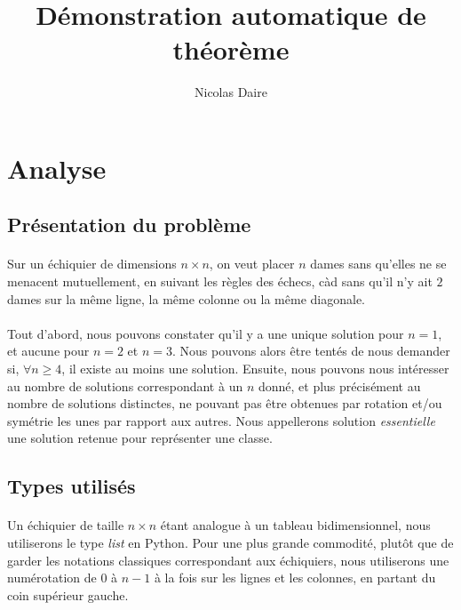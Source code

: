 \documentclass[a4paper]{article}
\title{Démonstration automatique de théorème}
\author{Nicolas Daire}
\date{}
\begin{document}
\maketitle

\tableofcontents

\section{Analyse}

\subsection{Présentation du problème}

\paragraph{}

\vspace{1em}

Sur un échiquier de dimensions $n \times n$, on veut placer $n$ dames sans qu'elles ne se menacent mutuellement, en suivant les règles des échecs, càd sans qu'il n'y ait $2$ dames sur la même ligne, la même colonne ou la même diagonale.

\paragraph{}
Tout d'abord, nous pouvons constater qu'il y a une unique solution pour $n=1$, et aucune pour $n=2$ et $n=3$. Nous pouvons alors être tentés de nous demander si, $\forall n\geq4$, il existe au moins une solution. Ensuite, nous pouvons nous intéresser au nombre de solutions correspondant à un $n$ donné, et plus précisément au nombre de solutions distinctes, ne pouvant pas être obtenues par rotation et/ou symétrie les unes par rapport aux autres. Nous appellerons solution \textit{essentielle} une solution retenue pour représenter une classe.

\subsection{Types utilisés}

\paragraph{}
Un échiquier de taille $ n\times n$ étant analogue à un tableau bidimensionnel, nous utiliserons le type \textit{list} en Python. Pour une plus grande commodité, plutôt que de garder les notations classiques correspondant aux échiquiers, nous utiliserons une numérotation de $0$ à $n-1$ à la fois sur les lignes et les colonnes, en partant du coin supérieur gauche.
\end{document}
